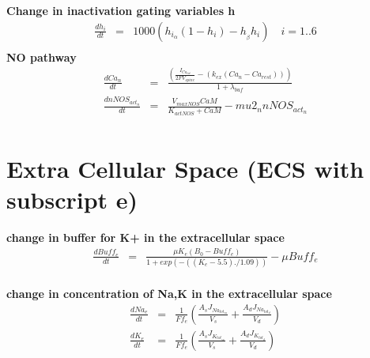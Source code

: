 \documentclass[fleqn]{report}
\numberwithin{equation}{section}
\numberwithin{equation}{section}
\begin{document}
\textbf{Change in inactivation gating variables h}
\begin{eqnarray}
\frac{dh_{i}}{dt}    &=& 1000 (h_{i_{\alpha}}  (1 - h_{i}) - h_{_{\beta}} h_{i})\quad i = 1..6\\
\end{eqnarray}
%            
\textbf{NO pathway }           
\begin{eqnarray}
\frac{dCa_{n}}{dt}&=&  \frac{( \frac{I_{Ca_{tot}}}{2 F V_{spine}}  - (k_{ex}  (Ca_{n} - Ca_{rest})))}{1 + \lambda_{buf}}\\%
 \frac{d nNOS_{act_{n}}}{dt} &=&  \frac{V_{maxNOS}  CaM }{K_{actNOS} + CaM} - mu2_n  nNOS_{{act}_{n}}\\ %
\end{eqnarray}



	\section{Extra Cellular Space (ECS with subscript e)}
	\textbf{ change in buffer for K+ in the extracellular space}
	\begin{eqnarray}
	 \frac{d Buff_{e}}{dt} &=&   \frac{\mu K_{e}(B_{0} - Buff_{e})}{1 + exp(-((K_e - 5.5) ./ 1.09))} - \mu  Buff_{e}\\
	\end{eqnarray}
	
	
	\textbf{ change in concentration of Na,K in the extracellular space }
	\begin{eqnarray}
	  \frac{d Na_{e}}{dt}    &=& \frac{1}{F f_{e}} ( \frac{A_{s} J_{Na{_{tot_{sa}}}}}{V_{s}}  +  \frac{A_{d} J_{Na_{tot_{d}}}}{V_{d}})\\
	 \frac{d K_{e}}{dt}   &=& \frac{1}{F f_{e}} ( \frac{A_{s} J_{K{_{tot_{sa}}}}}{V_{s}}  +  \frac{A_{d} J_{K_{tot_{d}}}}{V_{d}})\\
	\end{eqnarray}
	
\end{document}
